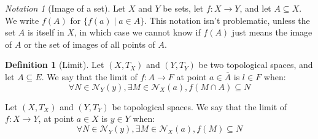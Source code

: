 \documentclass{article}
\theoremstyle{definition}
\newtheorem{definition}{Definition}[section]
\theoremstyle{remark}
\theoremstyle{example}
\theoremstyle{notation}
\newtheorem{notation}{Notation}[section]
\begin{document}
\begin{notation}[Image of a set]
		Let $X$ and $Y$ be sets, let $f : X \rightarrow Y$, and let $A \subseteq X$. We write $f(A)$ for $\{f(a) \mid a \in A\}$. This notation isn't problematic, unless the set $A$ is itself in $X$, in which case we cannot know if $f(A)$ just means the image of $A$ or the set of images of all points of $A$.
\end{notation}

\begin{definition}[Limit]
		Let $(X, T_X)$ and $(Y, T_Y)$ be two topological spaces, and let $A \subseteq E$. We say that the limit of $f : A \rightarrow F$ at point $a \in \overline{A}$ is $l \in F$ when:
				$$\forall N \in \mathcal{N}_Y(y), \exists M \in \mathcal{N}_X(a), f(M \cap A) \subseteq N$$

		Let $(X, T_X)$ and $(Y, T_Y)$ be topological spaces. We say that the limit of $f : X \rightarrow Y$, at point $a \in X$ is $y \in Y$ when:
				$$\forall N \in \mathcal{N}_Y(y), \exists M \in \mathcal{N}_X(a), f(M) \subseteq N$$

\end{definition}
\end{document}
